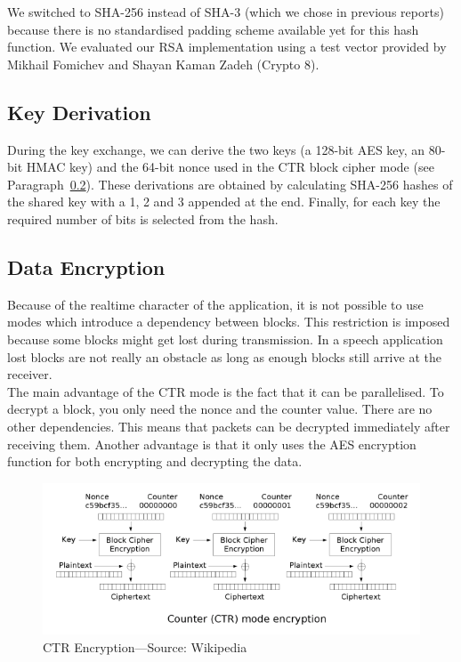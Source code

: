 \documentclass[a4paper]{article}
\begin{document}
We switched to SHA-256 instead of SHA-3 (which we chose in previous reports) because there is no standardised padding scheme available yet for this hash function. We evaluated our RSA implementation using a test vector provided by Mikhail Fomichev and Shayan Kaman Zadeh (Crypto 8).

\subsection{Key Derivation}
\label{par:key_derivation}

During the key exchange, we can derive the two keys (a 128-bit AES key, an 80-bit HMAC key) and the 64-bit nonce used in the CTR block cipher mode (see Paragraph~\ref{par:data_encryption}). These derivations are obtained by calculating SHA-256 hashes of the shared key with a 1, 2 and 3 appended at the end. Finally, for each key the required number of bits is selected from the hash.

\subsection{Data Encryption}
\label{par:data_encryption}

Because of the realtime character of the application, it is not possible to use modes which introduce a dependency between blocks. This restriction is imposed because some blocks might get lost during transmission. In a speech application lost blocks are not really an obstacle as long as enough blocks still arrive at the receiver.\\

The main advantage of the CTR mode is the fact that it can be parallelised. To decrypt a block, you only need the nonce and the counter value. There are no other dependencies. This means that packets can be decrypted immediately after receiving them. Another advantage is that it only uses the AES encryption function for both encrypting and decrypting the data.\\

\begin{figure}[h]
    \centering
    \includegraphics[scale=0.75]{ctr_encryption.png}
    \caption{CTR Encryption---Source: Wikipedia}
    \label{fig:ctr_encryption}
\end{figure}
\end{document}
